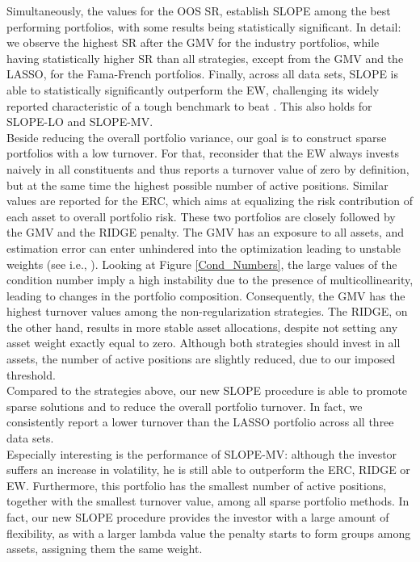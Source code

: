 \documentclass[12pt, a4paper]{article}
\begin{document}
\noindent
Simultaneously, the values for the OOS SR, establish SLOPE among the best performing portfolios, with some results being statistically significant. In detail: we observe the highest SR after the GMV for the industry portfolios, while having statistically higher SR than all strategies, except from the GMV and the LASSO, for the Fama-French portfolios. Finally, across all data sets, SLOPE is able to statistically significantly outperform the EW, challenging its widely reported characteristic of a tough benchmark to beat \citep{DeMiguel2009}. This also holds for SLOPE-LO and SLOPE-MV. \\
Beside reducing the overall portfolio variance, our goal is to construct sparse portfolios with a low turnover. For that, reconsider that the EW always invests naively in all constituents and thus reports a turnover value of zero by definition, but at the same time the highest possible number of active positions. Similar values are reported for the ERC, which aims at equalizing the risk contribution of each asset to overall portfolio risk. These two portfolios are closely followed by the GMV and the RIDGE penalty. The GMV has an exposure to all assets, and estimation error can enter unhindered into the optimization leading to unstable weights (see i.e., \cite{Ledoit2004}). Looking at Figure \ref{Cond_Numbers}, the large values of the condition number imply a high instability due to the presence of multicollinearity, leading to changes in the portfolio composition. Consequently, the GMV has the highest turnover values among the non-regularization strategies. The RIDGE, on the other hand, results in more stable asset allocations, despite not setting any asset weight exactly equal to zero. Although both strategies should invest in all assets, the number of active positions are slightly reduced, due to our imposed threshold. \\
Compared to the strategies above, our new SLOPE procedure is able to promote sparse solutions and to reduce the overall portfolio turnover. In fact, we consistently report a lower turnover than the LASSO portfolio across all three data sets.\\
Especially interesting is the performance of SLOPE-MV: although the investor suffers an increase in volatility, he is still able to outperform the ERC, RIDGE or EW. Furthermore, this portfolio has the smallest number of active positions, together with the smallest turnover value, among all sparse portfolio methods.  In fact, our new SLOPE procedure provides the investor with a large amount of flexibility, as with a larger lambda value the penalty starts to form groups among assets, assigning them the same weight.
\end{document}
